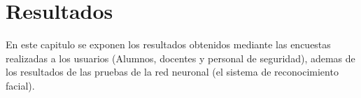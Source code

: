 \chapter{Resultados}
\label{Resultados}

En este capitulo se exponen los resultados obtenidos mediante las encuestas realizadas a los usuarios (Alumnos, docentes y personal de seguridad), ademas de los resultados de las pruebas de la red neuronal (el sistema de reconocimiento facial).


\newpage

\newpage

\newpage

\newpage

